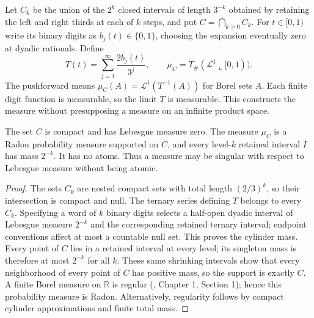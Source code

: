\begin{definition}\label{def:cantor-model}
Let $C_k$ be the union of the $2^k$ closed intervals of length $3^{-k}$ obtained by retaining the left and right thirds at each of $k$ steps, and put $C=\bigcap_{k\geq0}C_k$. For $t\in[0,1)$ write its binary digits as $b_j(t)\in\{0,1\}$, choosing the expansion eventually zero at dyadic rationals. Define
\[
 T(t)=\sum_{j=1}^{\infty}\frac{2b_j(t)}{3^j},
 \qquad \mu_C=T_\#(\mathcal L^1\llcorner[0,1)).
\]
The pushforward means $\mu_C(A)=\mathcal L^1(T^{-1}(A))$ for Borel sets $A$. Each finite digit function is measurable, so the limit $T$ is measurable. This constructs the measure without presupposing a measure on an infinite product space.
\end{definition}

\begin{proposition}\label{prop:cantor-cylinder-mass}
The set $C$ is compact and has Lebesgue measure zero. The measure $\mu_C$ is a Radon probability measure supported on $C$, and every level-$k$ retained interval $I$ has mass $2^{-k}$. It has no atoms. Thus a measure may be singular with respect to Lebesgue measure without being atomic.
\end{proposition}
\begin{proof}
The sets $C_k$ are nested compact sets with total length $(2/3)^k$, so their intersection is compact and null. The ternary series defining $T$ belongs to every $C_k$. Specifying a word of $k$ binary digits selects a half-open dyadic interval of Lebesgue measure $2^{-k}$ and the corresponding retained ternary interval; endpoint conventions affect at most a countable null set. This proves the cylinder mass. Every point of $C$ lies in a retained interval at every level; its singleton mass is therefore at most $2^{-k}$ for all $k$. These same shrinking intervals show that every neighborhood of every point of $C$ has positive mass, so the support is exactly $C$. A finite Borel measure on $\mathbb R$ is regular (\cite{Sim18}, Chapter 1, Section 1); hence this probability measure is Radon. Alternatively, regularity follows by compact cylinder approximations and finite total mass.
\end{proof}

